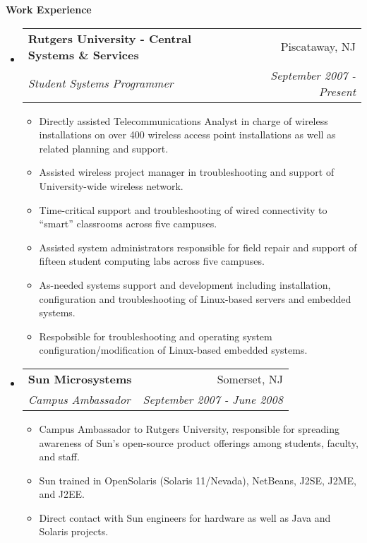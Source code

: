 \documentclass[letterpaper,11pt]{article}
\makeatletter
\newcommand{\resitem}[1]{\item #1 \vspace{-2pt}}
\newcommand{\resheading}[1]{{\large \colorbox{mygrey}{\begin{minipage}{\textwidth}{\textbf{#1 \vphantom{p\^{E}}}}\end{minipage}}}}
\newcommand{\ressubheading}[4]{
\begin{tabular*}{7.0in}{l@{\extracolsep{\fill}}r}
		\textbf{#1} & #2 \\
		\textit{#3} & \textit{#4} \\
\end{tabular*}\vspace{-6pt}}
\makeatother
\begin{document}
\resheading{Work Experience}
\begin{itemize}
\item
	\ressubheading{Rutgers University - Central Systems \& Services}{Piscataway, NJ}{Student Systems Programmer}{September 2007 - Present}
	\begin{itemize}
                \resitem{Directly assisted Telecommunications Analyst in
                  charge of wireless installations on over 400 wireless access
                  point installations as well as related planning and
                  support.}
                \resitem{Assisted wireless project manager in troubleshooting
                  and support of University-wide wireless network.}
                \resitem{Time-critical support and troubleshooting of wired
                  connectivity to ``smart'' classrooms across five campuses.}
                \resitem{Assisted system administrators responsible for field repair and support of fifteen student computing
                  labs across five campuses.}
                \resitem{As-needed systems support and development including
                  installation, configuration and troubleshooting of 
                  Linux-based servers and embedded systems.}
                \resitem{Respobsible for troubleshooting and operating system
                  configuration/modification of Linux-based embedded systems.}
	\end{itemize}

\item
        \ressubheading{Sun Microsystems}{Somerset, NJ}{Campus Ambassador}{September 2007 - June 2008}
        \begin{itemize}
                \resitem{Campus Ambassador to Rutgers University, responsible
                  for spreading awareness of Sun's open-source product
                  offerings among students, faculty, and staff.}
                \resitem{Sun trained in OpenSolaris (Solaris 11/Nevada),
                  NetBeans, J2SE, J2ME, and J2EE. }
                \resitem{Direct contact with Sun engineers for hardware as
                  well as Java and Solaris projects.}
        \end{itemize}


\end{itemize}
\end{document}
